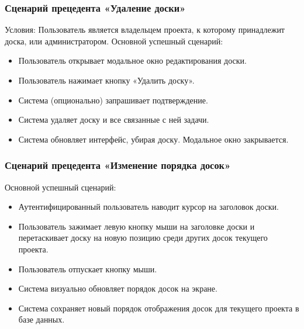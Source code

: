 \subsubsection{Сценарий прецедента «Удаление доски»}
Условия: Пользователь является владельцем проекта, к которому принадлежит доска, или администратором.
Основной успешный сценарий:
\begin{itemize}
	\item Пользователь открывает модальное окно редактирования доски.
	\item Пользователь нажимает кнопку «Удалить доску».
	\item Система (опционально) запрашивает подтверждение.
	\item Система удаляет доску и все связанные с ней задачи.
	\item Система обновляет интерфейс, убирая доску. Модальное окно закрывается.
\end{itemize}

\subsubsection{Сценарий прецедента «Изменение порядка досок»}
Основной успешный сценарий:
\begin{itemize}
	\item Аутентифицированный пользователь наводит курсор на заголовок доски.
	\item Пользователь зажимает левую кнопку мыши на заголовке доски и перетаскивает доску на новую позицию среди других досок текущего проекта.
	\item Пользователь отпускает кнопку мыши.
	\item Система визуально обновляет порядок досок на экране.
	\item Система сохраняет новый порядок отображения досок для текущего проекта в базе данных.
\end{itemize}

